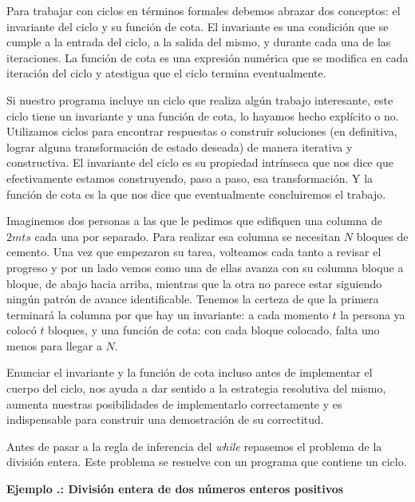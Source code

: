 \documentclass[12pt, a4paper, openany, fleqn]{book}
\newcounter{example}[chapter]
\renewcommand{\theexample}{\thechapter.\arabic{example}}
\newcommand{\example}[1]{
  \refstepcounter{example} %
  \vspace{1em}
  \noindent\textbf{Ejemplo \theexample: #1}
}
\begin{document}
    Para trabajar con ciclos en términos formales debemos abrazar dos conceptos: el invariante del ciclo y su función de cota.
    El invariante es una condición que se cumple a la entrada del ciclo, a la salida del mismo, y durante cada una de las iteraciones. La función de cota es una expresión numérica que se modifica en cada iteración del ciclo y atestigua que el ciclo termina eventualmente.

    Si nuestro programa incluye un ciclo que realiza algún trabajo interesante, este ciclo tiene un invariante y una función de cota, lo hayamos hecho explícito o no. Utilizamos ciclos para encontrar respuestas o construir soluciones (en definitiva, lograr alguna transformación de estado deseada) de manera iterativa y constructiva. El invariante del ciclo es su propiedad intrínseca que nos dice que efectivamente estamos construyendo, paso a paso, esa transformación. Y la función de cota es la que nos dice que eventualmente concluiremos el trabajo.

    Imaginemos dos personas a las que le pedimos que edifiquen una columna de $2mts$ cada una por separado. Para realizar esa columna se necesitan $N$ bloques de cemento. Una vez que empezaron su tarea, volteamos cada tanto a revisar el progreso y por un lado vemos como una de ellas avanza con su columna bloque a bloque, de abajo hacia arriba, mientras que la otra no parece estar siguiendo ningún patrón de avance identificable. Tenemos la certeza de que la primera terminará la columna por que hay un invariante: a cada momento $t$ la persona ya colocó $t$ bloques, y una función de cota: con cada bloque colocado, falta uno menos para llegar a $N$.

    Enunciar el invariante y la función de cota incluso antes de implementar el cuerpo del ciclo, nos ayuda a dar sentido a la estrategia resolutiva del mismo, aumenta nuestras posibilidades de implementarlo correctamente y es indispensable para construir una demostración de su correctitud.

    Antes de pasar a la regla de inferencia del \textit{while} repasemos el problema de la división entera. Este problema se resuelve con un programa que contiene un ciclo.

    \example{División entera de dos números enteros positivos}
\end{document}
